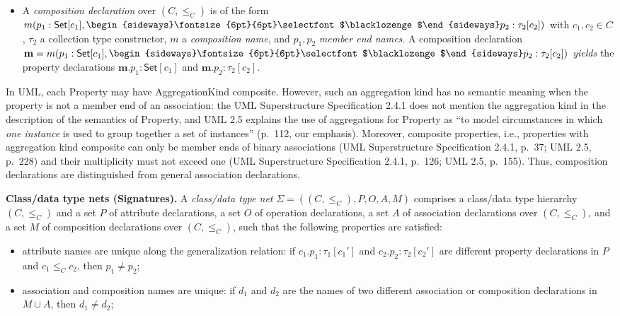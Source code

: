 \documentclass[10pt,fleqn,final]{scrreprt}
\newcommand{\cbs}[0]{\color{red}\xspace} %
\newcommand{\cbe}[0]{\color{black}\xspace} %
\newenvironment{definitions}[0]{\medskip }{}
\newcommand{\uml}[1]{\textsf{#1}}
\newcommand{\composition}{\raisebox{0.2pt}{\begin{sideways}\fontsize{6pt}{6pt}\selectfont$\blacklozenge$\end{sideways}}}
\begin{document}
\begin{definitions}
\begin{itemize}[label={--}, leftmargin=*]
  \item A \emph{composition declaration} over $(C, {\leq_C})$ is of the
form $m(p_1 : \mathsf{Set}[c_1], \composition p_2 : \tau_2[c_2])$ with
$c_1, c_2 \in C$, $\tau_2$ a collection type constructor, $m$ a
\emph{composition name}, and $p_1, p_2$ \emph{member end
  names}. A
composition declaration
$\mathbf{m} = m(p_1 : \mathsf{Set}[c_1], \composition p_2 :
\tau_2[c_2])$
\emph{yields} the property declarations
$\mathbf{m}.p_1 : \mathsf{Set}[c_1]$ and $\mathbf{m}.p_2 : \tau_2[c_2]$.
\end{itemize}
{In UML, each \uml{Property} may have
  \uml{AggregationKind} \uml{composite}.  However, such an aggregation
  kind has no semantic meaning when the property is not a member end of
  an association: the UML Superstructure Specification 2.4.1 does not
  mention the aggregation kind in the description of the semantics of
  \uml{Property}, and UML 2.5 explains the use of aggregations for
  \uml{Property} as ``to model circumstances in which \emph{one
    instance} is used to group together a set of instances'' (p.~112,
  our emphasis).  Moreover, composite properties, i.e., properties with
  aggregation kind \uml{composite} can only be member ends of binary
  associations (UML Superstructure Specification 2.4.1, p.~37; UML 2.5,
  p.~228) and their multiplicity must not exceed one (UML Superstructure
  Specification 2.4.1, p.~126; UML 2.5, p.~155).\cbs  Thus, 
  composition declarations are  distinguished from\cbe general association declarations.}


\medskip\noindent\textbf{Class/data type nets (Signatures).}
A \emph{class/data type net} $\Sigma = ((C, {\leq_C}), P, O, A, M)$
comprises a class/data type hierarchy $(C, {\leq_C})$ and a set $P$ of
attribute declarations, a set $O$ of operation declarations,
 a set $A$ of association declarations over
$(C, {\leq_C})$, and a set $M$ of composition declarations over $(C, {\leq_C})$, such that
the following properties are satisfied:
%
\begin{itemize}[label={--}, leftmargin=*]
  \item attribute names are unique along the generalization relation: if
$c_1.p_1 : \tau_1[c_1']$ and $c_2.p_2 : \tau_2[c_2']$ are different
property declarations in $P$ and $c_1 \leq_C c_2$, then $p_1 \neq
p_2$;

  \item association and composition names are unique: if $d_1$ and
$d_2$ are the names of two different association or composition
declarations in $M \cup A$, then $d_1 \neq d_2$;


\end{itemize}
\end{definitions}
\end{document}
